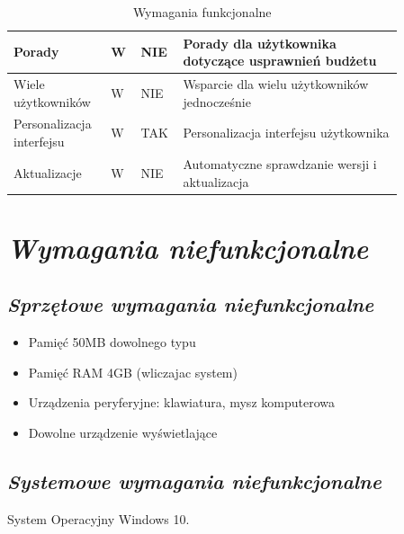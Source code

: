 \documentclass[a4paper,10pt, twoside]{report}
\newcommand{\customstylechapter}[1]{\large{\textit{#1}}}
\newcommand{\customstylesection}[1]{\textbf{\textit{#1}}}
\begin{document}
\begin{table}[h]
\begin{tabular}{|p{0.2\linewidth}|p{0.07\linewidth}|p{0.07\linewidth}|p{0.52\linewidth}|}
    \hline
    {Porady} & {W} & {NIE} & {Porady dla użytkownika dotyczące usprawnień budżetu}\\
    \hline
    {Wiele użytkowników} & {W} & {NIE} & {Wsparcie dla wielu użytkowników jednocześnie}\\
    \hline
    {Personalizacja interfejsu} & {W} & {TAK} & {Personalizacja interfejsu użytkownika}\\
    \hline
    {Aktualizacje} & {W} & {NIE} & {Automatyczne sprawdzanie wersji i aktualizacja}\\
    \hline
    \end{tabular}
    \caption{Wymagania funkcjonalne}
\end{table}

\chapter{\customstylechapter{Wymagania niefunkcjonalne}}
\section{\customstylesection{Sprzętowe wymagania niefunkcjonalne}}
\begin{itemize}
    \item Pamięć 50MB dowolnego typu
    \item Pamięć RAM 4GB (wliczajac system)
    \item Urządzenia peryferyjne: klawiatura, mysz komputerowa
    \item Dowolne urządzenie wyświetlające
\end{itemize}
\section{\customstylesection{Systemowe wymagania niefunkcjonalne}}
{System Operacyjny Windows 10.}

\end{document}
